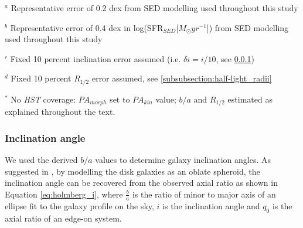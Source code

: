 \documentclass[fleqn,usenatbib]{mnras}
\begin{document}
\begin{table*}
\begin{threeparttable}
\begin{tablenotes}
      \small
      \item $^{a}$ Representative error of 0.2 dex from SED modelling used throughout this study
      \item $^{b}$ Representative error of 0.4 dex in log(SFR$_{SED}$[$M_{\odot}yr^{-1}$]) from SED modelling used throughout this study
      \item $^{c}$ Fixed 10 percent inclination error assumed (i.e. $\delta i = i / 10$, see \protect\cref{subsubsection:inclination_angle})
      \item $^{d}$ Fixed 10 percent $R_{1/2}$ error assumed, see \protect\cref{subsubsection:half-light_radii}
      \item $^{*}$ No {\em HST} coverage: $PA_{morph}$ set to $PA_{kin}$ value; $b/a$ and $R_{1/2}$ estimated as explained throughout the text.
    \end{tablenotes}
  \end{threeparttable}
  \end{table*}


\subsubsection{Inclination angle}\label{subsubsection:inclination_angle}
We used the derived $b/a$ values to determine galaxy inclination angles.
As suggested in \cite{Holmberg1958}, by modelling the disk galaxies as an oblate spheroid, the inclination angle can be recovered from the observed axial ratio as shown in Equation \ref{eq:holmberg_i}, where $\frac{b}{a}$ is the ratio of minor to major axis of an ellipse fit to the galaxy profile on the sky, $i$ is the inclination angle and $q_{0}$ is the axial ratio of an edge-on system.
\end{document}
